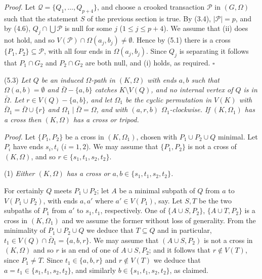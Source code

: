 \textit{Proof.} Let $\mathcal{Q} = \{Q_1, \dots, Q_{p+4}\}$, and choose a crooked transaction $\mathcal{P}$ in $(G, \Omega)$ such that the statement $S$ of the previous section is true. By (3.4), $|\mathcal{P}| = p$, and by (4.6), $Q_j \cap \bigcup \mathcal{P}$ is null for some $j$ ($1 \le j \le p+4$). We assume that (ii) does not hold, and so $V(\mathcal{P}) \cap \Omega(a_j, b_j) \ne \emptyset$. Hence by (5.1) there is a cross $\{P_1, P_2\} \subseteq \mathcal{P}$, with all four ends in $\Omega(a_j, b_j)$. Since $Q_j$ is separating it follows that $P_1 \cap G_2$ and $P_2 \cap G_2$ are both null, and (i) holds, as required. $\square$

\stmt
(5.3) \textit{Let $Q$ be an induced $\Omega$-path in $(K, \Omega)$ with ends $a, b$ such that $\Omega(a, b) = \emptyset$ and $\bar{\Omega} - \{a, b\}$ catches $K \setminus V(Q)$, and no internal vertex of $Q$ is in $\bar{\Omega}$. Let $r \in V(Q) - \{a, b\}$, and let $\Omega_1$ be the cyclic permutation in $V(K)$ with $\bar{\Omega}_1 = \bar{\Omega} \cup \{r\}$ and $\Omega_1 \mid \bar{\Omega} = \Omega$, and with $(a, r, b)$ $\Omega_1$-clockwise. If $(K, \Omega_1)$ has a cross then $(K, \Omega)$ has a cross or tripod.}

\textit{Proof.} Let $\{P_1, P_2\}$ be a cross in $(K, \Omega_1)$, chosen with $P_1 \cup P_2 \cup Q$ minimal. Let $P_i$ have ends $s_i, t_i$ ($i = 1, 2$). We may assume that $\{P_1, P_2\}$ is not a cross of $(K, \Omega)$, and so $r \in \{s_1, t_1, s_2, t_2\}$.

\hspace*{12pt}(1) \textit{Either $(K, \Omega)$ has a cross or $a, b \in \{s_1, t_1, s_2, t_2\}$.}

For certainly $Q$ meets $P_1 \cup P_2$; let $A$ be a minimal subpath of $Q$ from $a$ to $V(P_1 \cup P_2)$, with ends $a, a'$ where $a' \in V(P_1)$, say. Let $S, T$ be the two subpaths of $P_1$ from $a'$ to $s_1, t_1$, respectively. One of $\{A \cup S, P_2\}$, $\{A \cup T, P_2\}$ is a cross in $(K, \Omega_1)$ and we assume the former without loss of generality. From the minimality of $P_1 \cup P_2 \cup Q$ we deduce that $T \subseteq Q$ and in particular, $t_1 \in V(Q) \cap \bar{\Omega}_1 = \{a, b, r\}$. We may assume that $(A \cup S, P_2)$ is not a cross in $(K, \Omega)$ and so $r$ is an end of one of $A \cup S, P_2$; and it follows that $r \notin V(T)$, since $P_1 \ne T$. Since $t_1 \in \{a, b, r\}$ and $r \notin V(T)$ we deduce that $a = t_1 \in \{s_1, t_1, s_2, t_2\}$, and similarly $b \in \{s_1, t_1, s_2, t_2\}$, as claimed.

